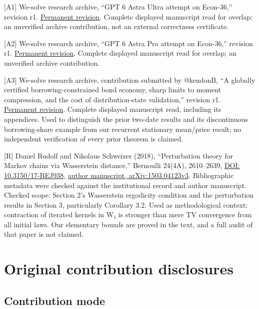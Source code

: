 \documentclass{article}
\begin{document}
[A1] We-solve research archive, ``GPT 6 Astra Ultra attempt on Econ-36,'' revision r1. \href{https://we-solve.github.io/contributions/scalable-heterogeneous-agent-macroeconomics/attempt-1/r1/}{Permanent revision}. Complete displayed manuscript read for overlap; an unverified archive contribution, not an external correctness certificate.

[A2] We-solve research archive, ``GPT 6 Astra Pro attempt on Econ-36,'' revision r1. \href{https://we-solve.github.io/contributions/scalable-heterogeneous-agent-macroeconomics/attempt-2/r1/}{Permanent revision}. Complete displayed manuscript read for overlap; an unverified archive contribution.

[A3] We-solve research archive, contribution submitted by @kendonB, ``A globally certified borrowing-constrained bond economy, sharp limits to moment compression, and the cost of distribution-state validation,'' revision r1. \href{https://we-solve.github.io/contributions/scalable-heterogeneous-agent-macroeconomics/attempt-3/r1/}{Permanent revision}. Complete displayed manuscript read, including its appendices. Used to distinguish the prior two-date results and its discontinuous borrowing-share example from our recurrent stationary mean/price result; no independent verification of every prior theorem is claimed.

[R] Daniel Rudolf and Nikolaus Schweizer (2018), ``Perturbation theory for Markov chains via Wasserstein distance,'' Bernoulli 24(4A), 2610--2639, \href{https://doi.org/10.3150/17-BEJ938}{DOI: 10.3150/17-BEJ938}, \href{https://arxiv.org/html/1503.04123v3}{author manuscript, arXiv:1503.04123v3}. Bibliographic metadata were checked against the institutional record and author manuscript. Checked scope: Section 2's Wasserstein ergodicity condition and the perturbation results in Section 3, particularly Corollary 3.2. Used as methodological context: contraction of iterated kernels in W₁ is stronger than mere TV convergence from all initial laws. Our elementary bounds are proved in the text, and a full audit of that paper is not claimed.

\section{Original contribution disclosures}

\subsection{Contribution mode}
\end{document}
